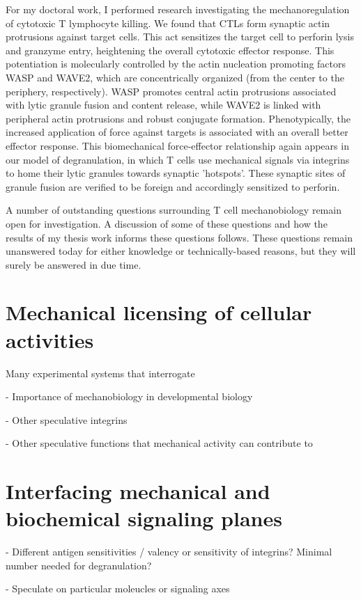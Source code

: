For my doctoral work, I performed research investigating the mechanoregulation of cytotoxic T lymphocyte killing. We found that CTLs form synaptic actin protrusions against target cells. This act sensitizes the target cell to perforin lysis and granzyme entry, heightening the overall cytotoxic effector response. This potentiation is molecularly controlled by the actin nucleation promoting factors WASP and WAVE2, which are concentrically organized (from the center to the periphery, respectively). WASP promotes central actin protrusions associated with lytic granule fusion and content release, while WAVE2 is linked with peripheral actin protrusions and robust conjugate formation. Phenotypically, the increased application of force against targets is associated with an overall better effector response. This biomechanical force-effector relationship again appears in our model of degranulation, in which T cells use mechanical signals via integrins to home their lytic granules towards synaptic 'hotspots'. These synaptic sites of granule fusion are verified to be foreign and accordingly sensitized to perforin. 

A number of outstanding questions surrounding T cell mechanobiology remain open for investigation. A discussion of some of these questions and how the results of my thesis work informs these questions follows. These questions remain unanswered today for either knowledge or technically-based reasons, but they will surely be answered in due time.

\section{Mechanical licensing of cellular activities}

Many experimental systems that interrogate 

- Importance of mechanobiology in developmental biology

- Other speculative integrins

- Other speculative functions that mechanical activity can contribute to

\section{Interfacing mechanical and biochemical signaling planes}

- Different antigen sensitivities / valency or sensitivity of integrins? Minimal number needed for degranulation?

- Speculate on particular moleucles or signaling axes

